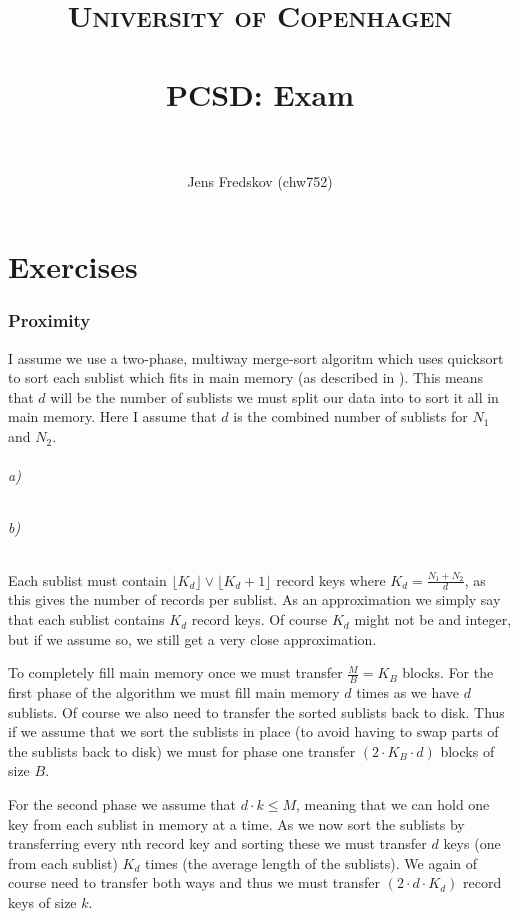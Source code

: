 \documentclass[a4paper, 11pt]{article}
\title{ 
\normalfont \normalsize 
\textsc{University of Copenhagen} \\ [25pt]
\horrule{0.5pt} \\[0.4cm]
\huge PCSD: Exam \\
\horrule{2pt} \\[0.5cm]
}
\author{Jens Fredskov (chw752)}
\begin{document}
\maketitle

\newpage
\part{Exercises} %
\label{prt:exercises_}

\section{Proximity} %
\label{sec:proximity}

I assume we use a two-phase, multiway merge-sort algoritm which uses quicksort to sort each sublist which fits in main memory (as described in \cite{chap10}). This means that $d$ will be the number of sublists we must split our data into to sort it all in main memory. Here I assume that $d$ is the combined number of sublists for $N_1$ and $N_2$.

\paragraph{a)} %


\paragraph{b)} %

Each sublist must contain $\lfloor K_d \rfloor \vee \lfloor K_d + 1 \rfloor$ record keys where $K_d = \frac{N_1 + N_2}{d}$, as this gives the number of records per sublist. As an approximation we simply say that each sublist contains $K_d$ record keys. Of course $K_d$ might not be and integer, but if we assume so, we still get a very close approximation.

To completely fill main memory once we must transfer $\frac{M}{B} = K_B$ blocks. For the first phase of the algorithm we must fill main memory $d$ times as we have $d$ sublists. Of course we also need to transfer the sorted sublists back to disk. Thus if we assume that we sort the sublists in place (to avoid having to swap parts of the sublists back to disk) we must for phase one transfer $(2 \cdot K_B \cdot d)$ blocks of size $B$.

For the second phase we assume that $d \cdot k \le M$, meaning that we can hold one key from each sublist in memory at a time. As we now sort the sublists by transferring every nth record key and sorting these we must transfer $d$ keys (one from each sublist) $K_d$ times (the average length of the sublists). We again of course need to transfer both ways and thus we must transfer $(2 \cdot d \cdot K_d)$ record keys of size $k$.
\end{document}
